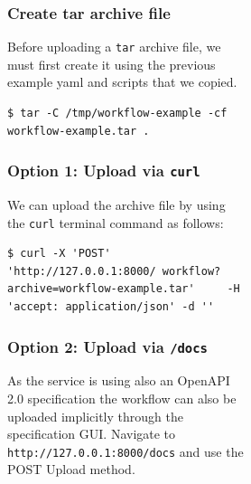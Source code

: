 \begin{figure}[htb]
\begin{figure}[htb]
\begin{figure}[htb]
\subsubsection{Create tar archive file}\label{create-tar-archive-file}

Before uploading a \texttt{tar} archive file, we must first create it
using the previous example yaml and scripts that we copied.

\smallskip
\begin{verbatim}
$ tar -C /tmp/workflow-example -cf workflow-example.tar .
\end{verbatim}
\smallskip

\subsubsection{\texorpdfstring{Option 1: Upload via
\texttt{curl}}{Option 1: Upload via curl}}\label{option-1-upload-via-curl}

We can upload the archive file by using the \texttt{curl} terminal
command as follows:

\smallskip
\begin{verbatim}
$ curl -X 'POST' 'http://127.0.0.1:8000/ workflow?archive=workflow-example.tar'     -H 'accept: application/json' -d ''
\end{verbatim}
\smallskip

\subsubsection{\texorpdfstring{Option 2: Upload via
\texttt{/docs}}{Option 2: Upload via /docs}}\label{option-2-upload-via-docs}

As the service is using also an OpenAPI 2.0 specification the workflow
can also be uploaded implicitly through the specification GUI. Navigate
to \texttt{http://127.0.0.1:8000/docs} and use the POST Upload method.


\end{figure}
\end{figure}
\end{figure}
